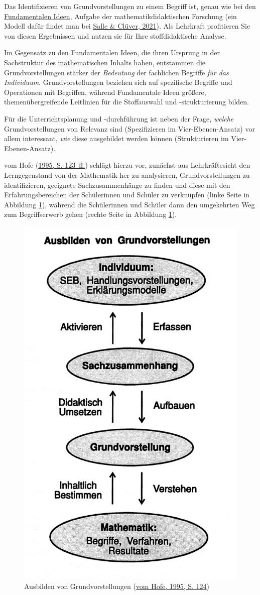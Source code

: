 \documentclass[
]{scrbook}
\theoremstyle{definition}
\theoremstyle{definition}
\theoremstyle{definition}
\theoremstyle{definition}
\theoremstyle{remark}
\begin{document}
Das Identifizieren von Grundvorstellungen zu einem Begriff ist, genau wie bei den \protect\hyperlink{fundamentale-ideen}{Fundamentalen Ideen}, Aufgabe der mathematikdidaktischen Forschung (ein Modell dafür findet man bei \protect\hyperlink{ref-Salle2021}{Salle \& Clüver, 2021}). Als Lehrkraft profitieren Sie von diesen Ergebnissen und nutzen sie für Ihre stoffdidaktische Analyse.

Im Gegensatz zu den Fundamentalen Ideen, die ihren Ursprung in der Sachstruktur des mathematischen Inhalts haben, entstammen die Grundvorstellungen stärker der \emph{Bedeutung} der fachlichen Begriffe \emph{für das Individuum}. Grundvorstellungen beziehen sich auf spezifische Begriffe und Operationen mit Begriffen, während Fundamentale Ideen größere, themenübergreifende Leitlinien für die Stoffauswahl und -strukturierung bilden.

Für die Unterrichtsplanung und -durchführung ist neben der Frage, \emph{welche} Grundvorstellungen von Relevanz sind (Spezifizieren im Vier-Ebenen-Ansatz) vor allem interessant, \emph{wie} diese ausgebildet werden können (Strukturieren im Vier-Ebenen-Ansatz).

vom Hofe (\protect\hyperlink{ref-Hofe:1995}{1995, S. 123~ff.}) schlägt hierzu vor, zunächst aus Lehrkräftesicht den Lerngegenstand von der Mathematik her zu analysieren, Grundvorstellungen zu identifizieren, geeignete Sachzusammenhänge zu finden und diese mit den Erfahrungsbereichen der Schülerinnen und Schüler zu verknüpfen (linke Seite in Abbildung \ref{fig:GVausbilden}), während die Schülerinnen und Schüler dann den umgekehrten Weg zum Begriffserwerb gehen (rechte Seite in Abbildung \ref{fig:GVausbilden}).



\begin{figure}

{\centering \includegraphics[width=0.5\linewidth]{pictures/3-GVausbilden} 

}

\caption{Ausbilden von Grundvorstellungen (\protect\hyperlink{ref-Hofe:1995}{vom Hofe, 1995, S. 124})}\label{fig:GVausbilden}
\end{figure}
\end{document}
